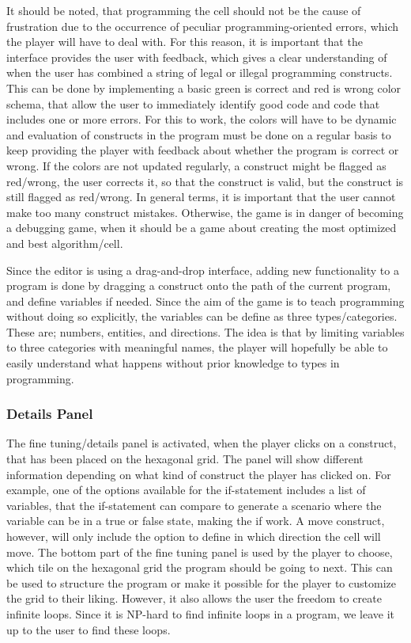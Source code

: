 It should be noted, that programming the cell should not be the cause of frustration due to the occurrence of peculiar programming-oriented errors, which the player will have to deal with.
For this reason, it is important that the interface provides the user with feedback, which gives a clear understanding of when the user has combined a string of legal or illegal programming constructs.
This can be done by implementing a basic green is correct and red is wrong color schema, that allow the user to immediately identify good code and code that includes one or more errors.
For this to work, the colors will have to be dynamic and evaluation of constructs in the program must be done on a regular basis to keep providing the player with feedback about whether the program is correct or wrong.
If the colors are not updated regularly, a construct might be flagged as red/wrong, the user corrects it, so that the construct is valid, but the construct is still flagged as red/wrong.
In general terms, it is important that the user cannot make too many construct mistakes.
Otherwise, the game is in danger of becoming a debugging game, when it should be a game about creating the most optimized and best algorithm/cell.\newline

Since the editor is using a drag-and-drop interface, adding new functionality to a program is done by dragging a construct onto the path of the current program, and define variables if needed.
Since the aim of the game is to teach programming without doing so explicitly, the variables can be define as three types/categories.
These are; numbers, entities, and directions.
The idea is that by limiting variables to three categories with meaningful names, the player will hopefully be able to easily understand what happens without prior knowledge to types in programming.

\subsubsection*{Details Panel}
The fine tuning/details panel is activated, when the player clicks on a construct, that has been placed on the hexagonal grid.
The panel will show different information depending on what kind of construct the player has clicked on.
For example, one of the options available for the if-statement includes a list of variables, that the if-statement can compare to generate a scenario where the variable can be in a true or false state, making the if work.
A move construct, however, will only include the option to define in which direction the cell will move.
The bottom part of the fine tuning panel is used by the player to choose, which tile on the hexagonal grid the program should be going to next.
This can be used to structure the program or make it possible for the player to customize the grid to their liking.
However, it also allows the user the freedom to create infinite loops.
Since it is NP-hard to find infinite loops in a program, we leave it up to the user to find these loops. 

